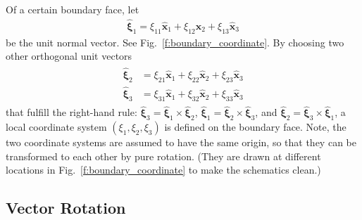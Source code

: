 \documentclass[a4paper,12pt,dvips]{article}
\begin{document}
Of a certain boundary face, let
%
\begin{align}
  \hat{\boldsymbol{\xi}}_1
  = \xi_{11} \hat{\mathbf{x}}_1
  + \xi_{12} \hat{\mathbf{x}}_2
  + \xi_{13} \hat{\mathbf{x}}_3
  \label{e:coord:xi1}
\end{align}
%
be the unit normal vector.  See Fig.~\ref{f:boundary_coordinate}.  By choosing
two other orthogonal unit vectors
%
\begin{align}
\begin{aligned}
  \hat{\boldsymbol{\xi}}_2
 &= \xi_{21} \hat{\mathbf{x}}_1
  + \xi_{22} \hat{\mathbf{x}}_2
  + \xi_{23} \hat{\mathbf{x}}_3
  \\
  \hat{\boldsymbol{\xi}}_3
 &= \xi_{31} \hat{\mathbf{x}}_1
  + \xi_{32} \hat{\mathbf{x}}_2
  + \xi_{33} \hat{\mathbf{x}}_3
\end{aligned}
\label{e:coord:xi23}
\end{align}
%
that fulfill the right-hand rule:
%
$\hat{\boldsymbol{\xi}}_3 = \hat{\boldsymbol{\xi}}_1 \times
\hat{\boldsymbol{\xi}}_2$,
%
$\hat{\boldsymbol{\xi}}_1 = \hat{\boldsymbol{\xi}}_2 \times
\hat{\boldsymbol{\xi}}_3$, and
%
$\hat{\boldsymbol{\xi}}_2 = \hat{\boldsymbol{\xi}}_3 \times
\hat{\boldsymbol{\xi}}_1$,
%
a local coordinate system $(\xi_1, \xi_2, \xi_3)$ is defined on the boundary
face.  Note, the two coordinate systems are assumed to have the same origin, so
that they can be transformed to each other by pure rotation.  (They are drawn
at different locations in Fig.~\ref{f:boundary_coordinate} to make the
schematics clean.)

\subsection{Vector Rotation}
\end{document}
